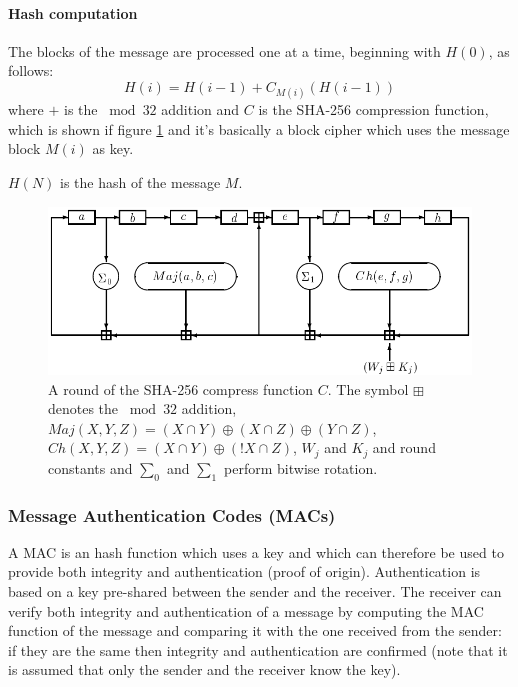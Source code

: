 \paragraph{Hash computation} The blocks of the message are processed one at a
time, beginning with $H(0)$, as follows:
\[ H(i) = H(i-1) + C_{M(i)}(H(i-1)) \]
where $+$ is the $\bmod 32$ addition and $C$ is the SHA-256 compression function,
which is shown if figure \ref{fig:sha256-compress-function} and it's basically
a block cipher which uses the message block $M(i)$ as key.

$H(N)$ is the hash of the message $M$.

\begin{figure}[!htb]
	\centering
	\includegraphics[width=1\linewidth]{img/sha-256-round.png}
	\caption{A round of the SHA-256 compress function $C$. The symbol $\boxplus$
  denotes the $\bmod 32$ addition, $Maj(X, Y, Z)=(X \cap Y) \oplus (X \cap Z) \oplus (Y \cap Z)$,
  $Ch(X,Y,Z)=	(X \cap Y) \oplus (!X \cap Z)$, $W_j$ and $K_j$ and round constants
  and $\sum_0$ and $\sum_1$ perform bitwise rotation.}
	\label{fig:sha256-compress-function}
\end{figure}

















\subsubsection{Message Authentication Codes (MACs)}
A MAC is an hash function which uses a key and which can therefore be used to
provide both integrity and authentication (proof of origin). Authentication is
based on a key pre-shared between the sender and the receiver. The receiver can
verify both integrity and authentication of a message by computing the MAC function
of the message and comparing it with the one received from the sender: if they are the
same then integrity and authentication are confirmed (note that it is assumed that
only the sender and the receiver know the key).

